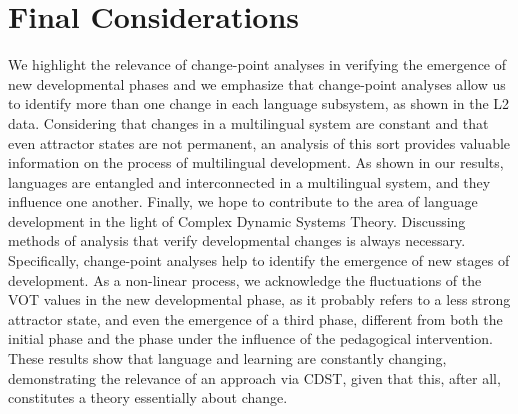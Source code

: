 \section{Final Considerations}
We highlight the relevance of change-point analyses in verifying the emergence
of new developmental phases and we emphasize that change-point analyses allow
us to identify more than one change in each language subsystem, as shown in the
L2 data. Considering that changes in a multilingual system are constant and
that even attractor states are not permanent, an analysis of this sort provides
valuable information on the process of multilingual development. As shown in
our results, languages are entangled and interconnected in a multilingual
system, and they influence one another. Finally, we hope to contribute to the
area of language development in the light of Complex Dynamic Systems Theory.
Discussing methods of analysis that verify developmental changes is always
necessary. Specifically, change-point analyses help to identify the emergence
of new stages of development. As a non-linear process, we acknowledge the
fluctuations of the VOT values in the new developmental phase, as it probably
refers to a less strong attractor state, and even the emergence of a third
phase, different from both the initial phase and the phase under the influence
of the pedagogical intervention. These results show that language and learning
are constantly changing, demonstrating the relevance of an approach via CDST,
given that this, after all, constitutes a theory essentially about change.






